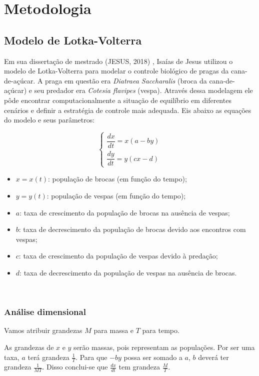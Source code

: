 \section{Metodologia}

\subsection{Modelo de Lotka-Volterra}

Em sua dissertação de mestrado (JESUS, 2018) \cite{ij_2018}, Isaías de Jesus utilizou o modelo de Lotka-Volterra para modelar o controle biológico de pragas da cana-de-açúcar. A praga em questão era \textit{Diatraea Saccharalis} (broca da cana-de-açúcar) e seu predador era \textit{Cotesia flavipes} (vespa). Através dessa modelagem ele pôde encontrar computacionalmente a situação de equilíbrio em diferentes cenários e definir a estratégia de controle mais adequada. Eis abaixo as equações do modelo e seus parâmetros:

$$\left\{
\begin{array}{l}
\dfrac{dx}{dt}=x(a-by)\\
\dfrac{dy}{dt}=y(cx-d)
\end{array}
\right.$$

\begin{itemize}
    \item $x=x(t)$: população de brocas (em função do tempo); 
    \item $y=y(t)$: população de vespas (em função do tempo);
    \item $a$: taxa de crescimento da população de brocas na ausência de vespas;
    \item $b$: taxa de decrescimento da população de brocas devido aos encontros com vespas;
    \item $c$: taxa de crescimento da população de vespas devido à predação;
    \item $d$: taxa de decrescimento da população de vespas na ausência de brocas.
\end{itemize}

\

\subsubsection{Análise dimensional}

Vamos atribuir grandezas $M$ para massa e $T$ para tempo.

As grandezas de $x$ e $y$ serão massas, pois representam as populações. Por ser uma taxa, $a$ terá grandeza $\frac{1}{T}$. Para que $-by$ possa ser somado a $a$, $b$ deverá ter grandeza $\frac{1}{MT}$. Disso conclui-se que $\frac{dx}{dt}$ tem grandeza $\frac{M}{T}$.

